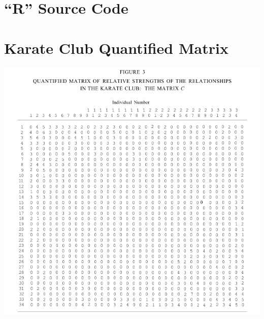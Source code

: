 \documentclass[letterpaper,11pt]{report}
\begin{document}



\appendix
{}

\chapter{``R'' Source Code} \label{chap:R}

\chapter{Karate Club Quantified Matrix} \label{chap:fig3}
\includegraphics[width=1.00\textwidth]{ZacharyFigure3.png}
\end{document}
